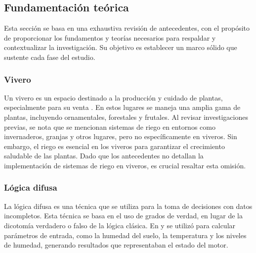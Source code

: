 \subsection{Fundamentación teórica}

Esta sección se basa en una exhaustiva revisión de antecedentes, con el
propósito de proporcionar los fundamentos y teorías necesarios para respaldar y
contextualizar la investigación. Su objetivo es establecer un marco sólido que
sustente cada fase del estudio.

\subsubsection{Vivero}
Un vivero es un espacio destinado a la producción y cuidado de plantas, especialmente para su venta \cite{peris_para_nodate}. En estos lugares se maneja una amplia gama de plantas, incluyendo ornamentales, forestales y frutales. Al revisar investigaciones previas, se nota que se mencionan sistemas de riego en entornos como invernaderos, granjas y otros lugares, pero no específicamente en viveros. Sin embargo, el riego es esencial en los viveros para garantizar el crecimiento saludable de las plantas. Dado que los antecedentes no detallan la implementación de sistemas de riego en viveros, es crucial resaltar esta omisión.

\subsubsection{Lógica difusa}
La lógica difusa es una técnica que se utiliza para la toma de decisiones con datos incompletos. Esta técnica se basa en el uso de grados de verdad, en lugar de la dicotomía verdadero o falso de la lógica clásica. En \cite{lema_holguin_implementacion_2018} \cite{salazar_irrigation_2013} \cite{hasan_implementation_2018} \cite{munir_intelligent_2019} \cite{al-ali_iot-solar_2019} \cite{krishnan_fuzzy_2020} \cite{kumar_irrigation_2020} \cite{benyezza_zoning_2021} \cite{noauthor_fuzzy_2023} \cite{neugebauer_fuzzy_2023} y \cite{mohammed_intelligent_nodate}  se utilizó para calcular parámetros de entrada, como la humedad del suelo, la temperatura y los niveles de humedad, generando resultados que representaban el estado del motor.


